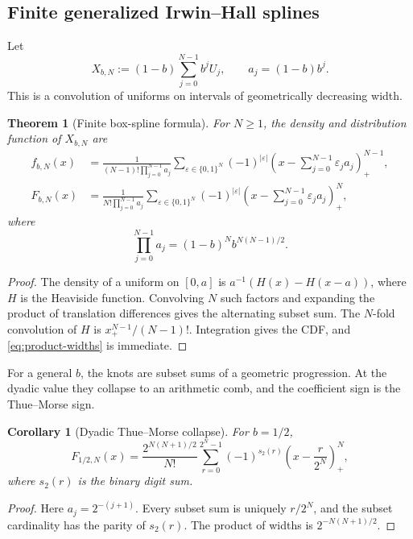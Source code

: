 \documentclass[11pt,oneside]{article}
\numberwithin{equation}{section}
\newtheorem{theorem}{Theorem}[section]
\newtheorem{corollary}[corollary]{Corollary}
\theoremstyle{definition}
\theoremstyle{remark}
\begin{document}
\subsection{Finite generalized Irwin--Hall splines}

Let
\[
 X_{b,N}:=(1-b)\sum_{j=0}^{N-1}b^jU_j,
 \qquad a_j=(1-b)b^j.
\]
This is a convolution of uniforms on intervals of geometrically decreasing
width.

\begin{theorem}[Finite box-spline formula]
For $N\ge1$, the density and distribution function of $X_{b,N}$ are
\begin{align}
 f_{b,N}(x)
 &=\frac1{(N-1)!\prod_{j=0}^{N-1}a_j}
 \sum_{\varepsilon\in\{0,1\}^N}
 (-1)^{|\varepsilon|}
 \left(x-\sum_{j=0}^{N-1}\varepsilon_ja_j\right)_+^{N-1},
 \label{eq:finite-density}\\
 F_{b,N}(x)
 &=\frac1{N!\prod_{j=0}^{N-1}a_j}
 \sum_{\varepsilon\in\{0,1\}^N}
 (-1)^{|\varepsilon|}
 \left(x-\sum_{j=0}^{N-1}\varepsilon_ja_j\right)_+^N,
 \label{eq:finite-CDF}
\end{align}
where
\begin{equation}
 \prod_{j=0}^{N-1}a_j=(1-b)^Nb^{N(N-1)/2}.
 \label{eq:product-widths}
\end{equation}
\end{theorem}

\begin{proof}
The density of a uniform on $[0,a]$ is
$a^{-1}(H(x)-H(x-a))$, where $H$ is the Heaviside function.  Convolving $N$
such factors and expanding the product of translation differences gives the
alternating subset sum.  The $N$-fold convolution of $H$ is
$x_+^{N-1}/(N-1)!$.  Integration gives the CDF, and
\eqref{eq:product-widths} is immediate.
\end{proof}

For a general $b$, the knots are subset sums of a geometric progression.  At
the dyadic value they collapse to an arithmetic comb, and the coefficient sign
is the Thue--Morse sign.

\begin{corollary}[Dyadic Thue--Morse collapse]
For $b=1/2$,
\begin{equation}
 F_{1/2,N}(x)
 =\frac{2^{N(N+1)/2}}{N!}
 \sum_{r=0}^{2^N-1}(-1)^{s_2(r)}
 \left(x-\frac{r}{2^N}\right)_+^N,
 \label{eq:dyadic-finite-CDF}
\end{equation}
where $s_2(r)$ is the binary digit sum.
\end{corollary}

\begin{proof}
Here $a_j=2^{-(j+1)}$.  Every subset sum is uniquely $r/2^N$, and the subset
cardinality has the parity of $s_2(r)$.  The product of widths is
$2^{-N(N+1)/2}$.
\end{proof}
\end{document}
